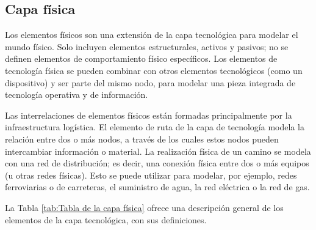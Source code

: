 
 
\subsection{Capa física}
Los elementos físicos son una extensión de la capa tecnológica para modelar el mundo físico. Solo incluyen elementos estructurales, activos y pasivos; no se definen elementos de comportamiento físico específicos. Los elementos de tecnología física se pueden combinar con otros elementos tecnológicos (como un dispositivo) y ser parte del mismo nodo, para modelar una pieza integrada de tecnología operativa y de información.

Las interrelaciones de elementos físicos están formadas principalmente por la infraestructura logística. El elemento de ruta de la capa de tecnología modela la relación entre dos o más nodos, a través de los cuales estos nodos pueden intercambiar información o material. La realización física de un camino se modela con una red de distribución; es decir, una conexión física entre dos o más equipos (u otras redes físicas). Esto se puede utilizar para modelar, por ejemplo, redes ferroviarias o de carreteras, el suministro de agua, la red eléctrica o la red de gas.

La Tabla \ref{tab:Tabla de la capa física} ofrece una descripción general de los elementos de la capa tecnológica, con sus definiciones.\cite{archimate} 


